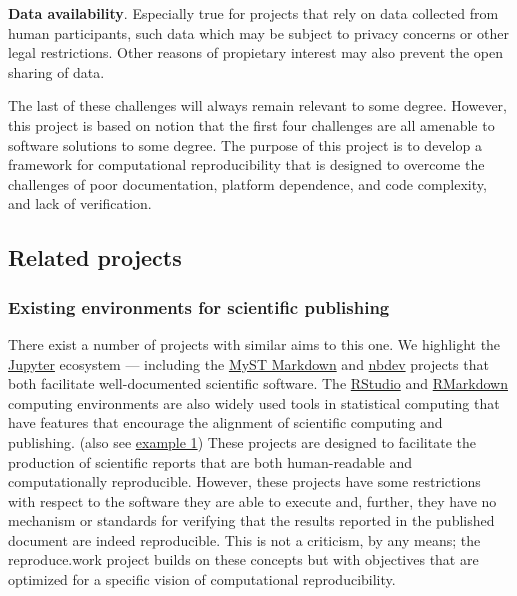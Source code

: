 \textbf{Data availability}. Especially true for projects that rely on data collected from human participants, such data which may be subject to privacy concerns or other legal restrictions. Other reasons of propietary interest may also prevent the open sharing of data.

The last of these challenges will always remain relevant to some degree. However, this project is based on notion that the first four challenges are all amenable to software solutions to some degree. The purpose of this project is to develop a framework for computational reproducibility that is designed to overcome the challenges of poor documentation, platform dependence, and code complexity, and lack of verification. 

\hypertarget{related-projects}{%
\subsection{Related projects}\label{related-projects}}

\hypertarget{existing-environments-for-scientific-publishing}{%
\subsubsection{Existing environments for scientific publishing}\label{existing-environments-for-scientific-publishing}}

There exist a number of projects with similar aims to this one. We highlight the \href{https://jupyter.org/}{Jupyter} ecosystem --- including 
the \href{https://jupyterbook.org/en/stable/content/myst.html}{MyST Markdown} and \href{https://nbdev.fast.ai/}{nbdev} projects that both facilitate well-documented scientific software. The \href{https://rstudio.com/}{RStudio} and 
 \href{https://rmarkdown.rstudio.com/}{RMarkdown} computing environments are also widely used tools in statistical computing that have features that encourage the alignment of scientific computing and publishing. (also see \href{https://mine-cetinkaya-rundel.github.io/improve-repro-workflow-reproducibilitea-2020/}{example 1}) These projects are designed to facilitate the production of scientific reports that are both human-readable and computationally reproducible. However, these projects have some restrictions with respect to the software they are able to execute and, further, they have no mechanism or standards for verifying that the results reported in the published document are indeed reproducible. This is not a criticism, by any means; the reproduce.work project builds on these concepts but with objectives that are optimized for a specific vision of computational reproducibility. 

